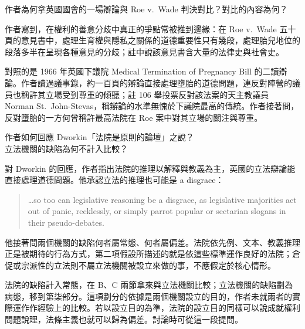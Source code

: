 
\begin{qaquestion}
作者為何拿英國國會的一場辯論與 Roe v.\ Wade 判決對比？對比的內容為何？
\end{qaquestion}

作者寫到，在權利的善意分歧中真正的爭點常被推到邊緣：在 Roe v.\ Wade 五十頁的意見書中，處理生育權與隱私之關係的道德重要性只有幾段，處理胎兒地位的段落多半在呈現各種意見的分歧；註中說該意見書含大量的法律史與社會史。

對照的是 1966 年英國下議院 Medical Termination of Pregnancy Bill 的二讀辯論。作者讀過議事錄，約一百頁的辯論直接處理墮胎的道德問題，連反對陣營的議員也稱許其立場受到尊重的傾聽；註 106 舉投票反對該法案的天主教議員 Norman St.\ John-Stevas，稱辯論的水準無愧於下議院最高的傳統。作者接著問，反對墮胎的一方何曾稱許最高法院在 Roe 案中對其立場的關注與尊重。


\begin{qaquestion}
作者如何回應 Dworkin「法院是原則的論壇」之說？\\
立法機關的缺陷為何不計入比較？
\end{qaquestion}

對 Dworkin 的回應，作者指出法院的推理以解釋與教義為主，英國的立法辯論能直接處理道德問題。他承認立法的推理也可能是 a disgrace：

\begin{quote}
\ldots so too can legislative reasoning be a disgrace, as legislative majorities act out of panic, recklessly, or simply parrot popular or sectarian slogans in their pseudo-debates.
\end{quote}

他接著問兩個機關的缺陷何者屬常態、何者屬偏差。法院依先例、文本、教義推理正是被期待的行為方式，第二項假設所描述的就是依這些標準運作良好的法院；倉促或宗派性的立法則不屬立法機關被設立來做的事，不應假定於核心情形。

\begin{readernote}
法院的缺陷計入常態，在 B、C 兩節拿來與立法機關比較；立法機關的缺陷劃為病態，移到第柒部分。這項劃分的依據是兩個機關設立的目的，作者未就兩者的實際運作作經驗上的比較。若以設立目的為準，法院的設立目的同樣可以說成就權利問題說理，法條主義也就可以歸為偏差。討論時可從這一段提問。
\end{readernote}
